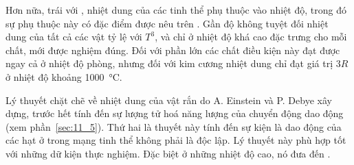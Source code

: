 
Hơn nữa, trái với , nhiệt dung của các tinh thể phụ thuộc vào nhiệt độ, trong đó sự phụ thuộc này có đặc điểm được nêu trên . Gần độ không tuyệt đối nhiệt dung của tất cả các vật tỷ lệ với $T^3$, và chỉ ở nhiệt độ khá cao đặc trưng cho mỗi chất,  mới được nghiệm đúng. Đối với phần lớn các chất điều kiện này đạt được ngay cả ở nhiệt độ phòng, nhưng đối với kim cương nhiệt dung chỉ đạt giá trị $3R$ ở nhiệt độ khoảng \SI{1000}{\degreeCelsius}.


Lý thuyết chặt chẽ về nhiệt dung của vật rắn do A. Einstein và P. Debye xây dựng, trước hết tính đến sự lượng tử hoá năng lượng của chuyển động dao động (xem phần~\ref{sec:11_5}). Thứ hai là thuyết này tính đến sự kiện là dao động của các hạt ở trong mạng tinh thể không phải là độc lập. Lý thuyết này phù hợp tốt với những dữ kiện thực nghiệm. Đặc biệt ở những nhiệt độ cao, nó đưa đến .
